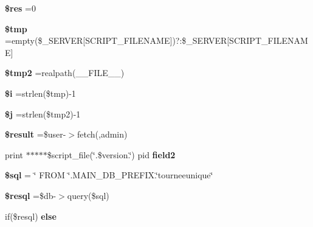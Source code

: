 \begin{DoxyCompactItemize}
{\bfseries \$res} =0
\item 
\mbox{\label{scripts_2tourneeunique_8php_a57024d47cf8348153f5fdda16f8fefa9}} 
{\bfseries \$tmp} =empty(\$\+\_\+\+S\+E\+R\+V\+ER\mbox{[}\textquotesingle{}S\+C\+R\+I\+P\+T\+\_\+\+F\+I\+L\+E\+N\+A\+ME\textquotesingle{}\mbox{]})?\textquotesingle{}\textquotesingle{}\+:\$\+\_\+\+S\+E\+R\+V\+ER\mbox{[}\textquotesingle{}S\+C\+R\+I\+P\+T\+\_\+\+F\+I\+L\+E\+N\+A\+ME\textquotesingle{}\mbox{]}
\item 
\mbox{\label{scripts_2tourneeunique_8php_aed9bcb6730d1510376ce80e32bd9504d}} 
{\bfseries \$tmp2} =realpath(\+\_\+\+\_\+\+F\+I\+L\+E\+\_\+\+\_\+)
\item 
\mbox{\label{scripts_2tourneeunique_8php_a83018d9153d17d91fbcf3bc10158d34f}} 
{\bfseries \$i} =strlen(\$tmp)-\/1
\item 
\mbox{\label{scripts_2tourneeunique_8php_a6f16db779ef3ccea921b277b5dc245d1}} 
{\bfseries \$j} =strlen(\$tmp2)-\/1
\item 
\mbox{\label{scripts_2tourneeunique_8php_a112ef069ddc0454086e3d1e6d8d55d07}} 
{\bfseries \$result} =\$user-\/$>$fetch(\textquotesingle{}\textquotesingle{},\textquotesingle{}admin\textquotesingle{})
\item 
\mbox{\label{scripts_2tourneeunique_8php_af9edfce80596a171cfb2884ba7ad01df}} 
print $\ast$$\ast$$\ast$$\ast$$\ast$\$script\+\_\+file(\char`\"{}.\$version.\char`\"{}) pid {\bfseries field2}
\item 
\mbox{\label{scripts_2tourneeunique_8php_a047170d6020a882807665812a27e2525}} 
{\bfseries \$sql} = \char`\"{} F\+R\+OM \char`\"{}.M\+A\+I\+N\+\_\+\+D\+B\+\_\+\+P\+R\+E\+F\+I\+X.\char`\"{}tourneeunique\char`\"{}
\item 
\mbox{\label{scripts_2tourneeunique_8php_a6adc5ef389ab51c21dee69262018d615}} 
{\bfseries \$resql} =\$db-\/$>$query(\$sql)
\item 
if(\$resql) {\bfseries else}
\end{DoxyCompactItemize}


